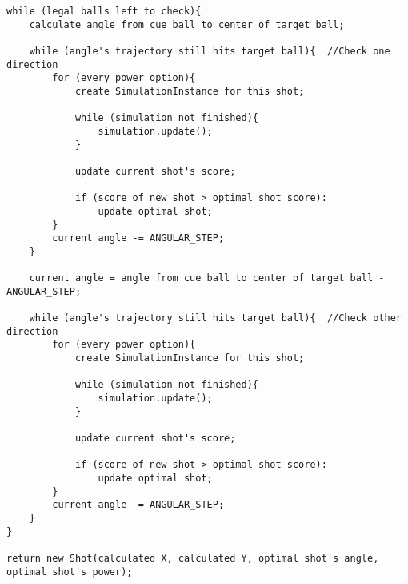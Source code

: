 \documentclass[titlepage]{article}
\begin{document}
\begin{lstlisting}
while (legal balls left to check){
	calculate angle from cue ball to center of target ball;
	
	while (angle's trajectory still hits target ball){	//Check one direction
		for (every power option){
			create SimulationInstance for this shot;
			
			while (simulation not finished){
				simulation.update();
			}
			
			update current shot's score;
			
			if (score of new shot > optimal shot score):
				update optimal shot;
		}		
		current angle -= ANGULAR_STEP;
	}

	current angle = angle from cue ball to center of target ball - ANGULAR_STEP;
	
	while (angle's trajectory still hits target ball){	//Check other direction
		for (every power option){
			create SimulationInstance for this shot;
			
			while (simulation not finished){
				simulation.update();
			}
			
			update current shot's score;
			
			if (score of new shot > optimal shot score):
				update optimal shot;
		}		
		current angle -= ANGULAR_STEP;
	}
}

return new Shot(calculated X, calculated Y, optimal shot's angle, optimal shot's power);
\end{lstlisting}
\newpage
\end{document}
